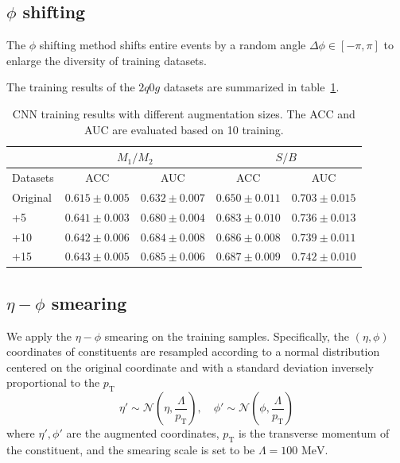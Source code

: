 \documentclass[12pt]{article}
\begin{document}
    \subsection{\texorpdfstring{$\phi$}{phi} shifting}%
    \label{sub:phi_shifting}
        The $\phi$ shifting method shifts entire events by a random angle $\Delta\phi \in [-\pi, \pi]$ to enlarge the diversity of training datasets.

        The training results of the $2q0g$ datasets are summarized in table~\ref{tab:CWoLa_CNN_training_results_3000_jet_tagging_phi_aug_5_10_15}. 
        \begin{table}[htpb]
            \centering
            \caption{CNN training results with different augmentation sizes. The ACC and AUC are evaluated based on 10 training.}
            \label{tab:CWoLa_CNN_training_results_3000_jet_tagging_phi_aug_5_10_15}
            \begin{tabular}{l|cc|cc}
                         & \multicolumn{2}{c|}{$M_1 / M_2$}      & \multicolumn{2}{c}{$S / B$}           \\ \hline
                Datasets & ACC               & AUC               & ACC               & AUC               \\ \hline
                Original & $0.615 \pm 0.005$ & $0.632 \pm 0.007$ & $0.650 \pm 0.011$ & $0.703 \pm 0.015$ \\
                +5       & $0.641 \pm 0.003$ & $0.680 \pm 0.004$ & $0.683 \pm 0.010$ & $0.736 \pm 0.013$ \\
                +10      & $0.642 \pm 0.006$ & $0.684 \pm 0.008$ & $0.686 \pm 0.008$ & $0.739 \pm 0.011$ \\
                +15      & $0.643 \pm 0.005$ & $0.685 \pm 0.006$ & $0.687 \pm 0.009$ & $0.742 \pm 0.010$
            \end{tabular}
        \end{table} 
    \subsection{\texorpdfstring{$\eta-\phi$}{eta-phi} smearing}%
    \label{sub:eta_phi_smearing}
        We apply the $\eta-\phi$ smearing on the training samples. Specifically, the $\left( \eta,\phi \right) $ coordinates of constituents are resampled according to a normal distribution centered on the original coordinate and with a standard deviation inversely proportional to the $p_{\text{T}}$
        \begin{equation}
            \eta' \sim \mathcal{N}\left(\eta, \frac{\Lambda}{p_{\text{T}}}\right), \quad \phi' \sim \mathcal{N}\left(\phi, \frac{\Lambda}{p_{\text{T}}}\right)
        \end{equation}
        where $\eta', \phi'$ are the augmented coordinates, $p_{\text{T}}$ is the transverse momentum of the constituent, and the smearing scale is set to be $\Lambda = \text{100 MeV}$.
\end{document}
